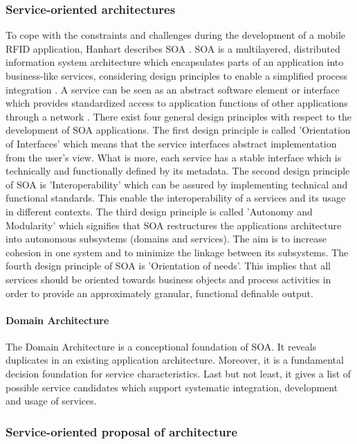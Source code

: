 \subsubsection{Service-oriented architectures}

To cope with the constraints and challenges during the development of a mobile RFID application, Hanhart describes \ac{SOA} \cite[p.31 ff.]{mobile}. SOA is a multilayered, distributed information system architecture which encapsulates parts of an application into business-like services, considering design principles to enable a simplified process integration \cite[p.32]{mobile}. A service can be seen as an abstract software element or interface which provides standardized access to application functions of other applications through a network \cite[p.32]{mobile}. There exist four general design principles with respect to the development of SOA applications. The first design principle is called 'Orientation of Interfaces' which means that the service interfaces abstract implementation from the user's view. What is more, each service has a stable interface which is technically and functionally defined by its metadata. The second design principle of SOA is 'Interoperability' which can be assured by implementing technical and functional standards. This enable the interoperability of a services and its usage in different contexts. The third design principle is called 'Autonomy and Modularity' which signifies that SOA restructures the applications architecture into autonomous subsystems (domains and services). The aim is to increase cohesion in one system and to minimize the linkage between its subsystems. The fourth design principle of SOA is 'Orientation of needs'. This implies that all services should be oriented towards business objects and process activities in order to provide an approximately granular, functional definable output. 

\paragraph{Domain Architecture}

The Domain Architecture is a conceptional foundation of SOA. It reveals duplicates in an existing application architecture. Moreover, it is a fundamental decision foundation for service characteristics. Last but not least, it gives a list of possible service candidates which support systematic integration, development and usage of services.

\subsubsection{Service-oriented proposal of architecture}

